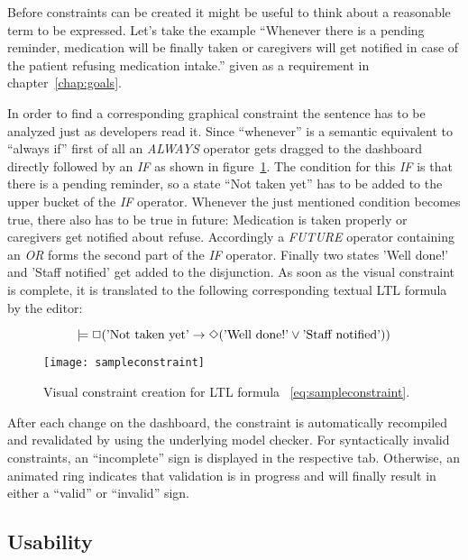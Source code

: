 Before constraints can be created it might be useful to think about a reasonable term to be expressed. Let's take the example ``Whenever there is a pending reminder, medication will be finally taken or caregivers will get notified in case of the patient refusing medication intake.'' given as a requirement in chapter~\ref{chap:goals}.

In order to find a corresponding graphical constraint the sentence has to be analyzed just as developers read it. Since ``whenever'' is a semantic equivalent to ``always if'' first of all an \emph{ALWAYS} operator gets dragged to the dashboard directly followed by an \emph{IF} as shown in figure~\ref{fig:sampleconstraint}. The condition for this \emph{IF} is that there is a pending reminder, so a state ``Not taken yet'' has to be added to the upper bucket of the \emph{IF} operator.
Whenever the just mentioned condition becomes true, there also has to be true in future: Medication is taken properly or caregivers get notified about refuse. Accordingly a \emph{FUTURE} operator containing an \emph{OR} forms the second part of the \emph{IF} operator. Finally two states 'Well done!' and 'Staff notified' get added to the disjunction.
As soon as the visual constraint is complete, it is translated to the following corresponding textual LTL formula by the editor:

\begin{equation} \label{eq:sampleconstraint}
  \models \Box (\textnormal{'Not taken yet'} \rightarrow \Diamond (\textnormal{'Well done!'} \vee \textnormal{'Staff notified'}))
\end{equation}

\begin{figure}[htbp]
  \centering
  \texttt{[image: sampleconstraint]}
  \caption{Visual constraint creation for LTL formula ~\ref{eq:sampleconstraint}.}
  \label{fig:sampleconstraint}
\end{figure}

After each change on the dashboard, the constraint is automatically recompiled and revalidated by using the underlying model checker. For syntactically invalid constraints, an ``incomplete'' sign is displayed in the respective tab. Otherwise, an animated ring indicates that validation is in pro\-gress and will finally result in either a ``valid'' or ``invalid'' sign.



\subsection{Usability}

